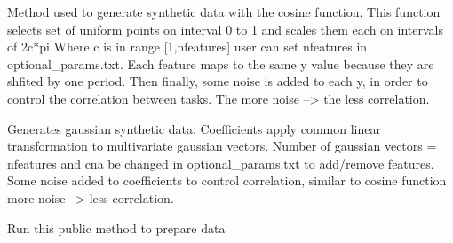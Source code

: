 \documentclass[letterpaper,10pt,english,openany,oneside]{sphinxmanual}
\begin{document}
\begin{fulllineitems}
\begin{fulllineitems}
\label{\detokenize{data:datasets.SyntheticData.SyntheticDataCreator.generateCosSynthData}}
Method used to generate synthetic data with the cosine function. 
This function selects set of uniform points on interval 0 to 1 and scales them each on intervals of 2c*pi
Where c is in range {[}1,nfeatures{]} user can set nfeatures in optional\_params.txt. Each feature maps 
to the same y value because they are shfited by one period. Then finally, some noise is added to each y,
in order to control the correlation between tasks. The more noise –> the less correlation.

\end{fulllineitems}


\begin{fulllineitems}
\label{\detokenize{data:datasets.SyntheticData.SyntheticDataCreator.generateSynthData}}
Generates gaussian synthetic data. Coefficients apply common linear transformation to 
multivariate gaussian vectors. Number of gaussian vectors = nfeatures and cna be changed in optional\_params.txt
to add/remove features. Some noise added to coefficients to control correlation, similar to cosine function
more noise –> less correlation.

\end{fulllineitems}


\begin{fulllineitems}
\label{\detokenize{data:datasets.SyntheticData.SyntheticDataCreator.prepare_data}}
Run this public method to prepare data


\end{fulllineitems}
\end{fulllineitems}
\end{document}
